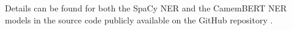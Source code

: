 Details can be found for both the SpaCy NER and the CamemBERT NER models in the source code publicly available on the GitHub repository .





